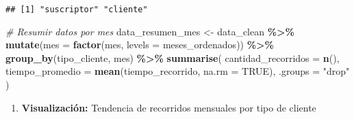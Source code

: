 \documentclass[
]{article}
\newenvironment{Shaded}{\begin{snugshade}}{\end{snugshade}}
\newcommand{\AttributeTok}[1]{\textcolor[rgb]{0.13,0.29,0.53}{#1}}
\newcommand{\CommentTok}[1]{\textcolor[rgb]{0.56,0.35,0.01}{\textit{#1}}}
\newcommand{\ConstantTok}[1]{\textcolor[rgb]{0.56,0.35,0.01}{#1}}
\newcommand{\FunctionTok}[1]{\textcolor[rgb]{0.13,0.29,0.53}{\textbf{#1}}}
\newcommand{\NormalTok}[1]{#1}
\newcommand{\OtherTok}[1]{\textcolor[rgb]{0.56,0.35,0.01}{#1}}
\newcommand{\SpecialCharTok}[1]{\textcolor[rgb]{0.81,0.36,0.00}{\textbf{#1}}}
\newcommand{\StringTok}[1]{\textcolor[rgb]{0.31,0.60,0.02}{#1}}
\providecommand{\tightlist}{%
  \setlength{\itemsep}{0pt}\setlength{\parskip}{0pt}}
\begin{document}
\begin{verbatim}
## [1] "suscriptor" "cliente"
\end{verbatim}

\begin{Shaded}
\begin{Highlighting}[]
\CommentTok{\# Resumir datos por mes}
\NormalTok{data\_resumen\_mes }\OtherTok{\textless{}{-}}\NormalTok{ data\_clean }\SpecialCharTok{\%\textgreater{}\%}
  \FunctionTok{mutate}\NormalTok{(}\AttributeTok{mes =} \FunctionTok{factor}\NormalTok{(mes, }\AttributeTok{levels =}\NormalTok{ meses\_ordenados)) }\SpecialCharTok{\%\textgreater{}\%}
  \FunctionTok{group\_by}\NormalTok{(tipo\_cliente, mes) }\SpecialCharTok{\%\textgreater{}\%}
  \FunctionTok{summarise}\NormalTok{(}
    \AttributeTok{cantidad\_recorridos =} \FunctionTok{n}\NormalTok{(),}
    \AttributeTok{tiempo\_promedio =} \FunctionTok{mean}\NormalTok{(tiempo\_recorrido, }\AttributeTok{na.rm =} \ConstantTok{TRUE}\NormalTok{),}
    \AttributeTok{.groups =} \StringTok{"drop"}
\NormalTok{  )}
\end{Highlighting}
\end{Shaded}

\begin{enumerate}
\def\labelenumi{\arabic{enumi}.}
\setcounter{enumi}{1}
\tightlist
\item
  \textbf{Visualización:} Tendencia de recorridos mensuales por tipo de
  cliente
\end{enumerate}
\end{document}
